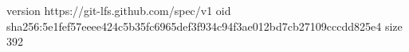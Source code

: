 version https://git-lfs.github.com/spec/v1
oid sha256:5e1fef57eeee424c5b35fc6965def3f934c94f3ae012bd7cb27109cccdd825e4
size 392
